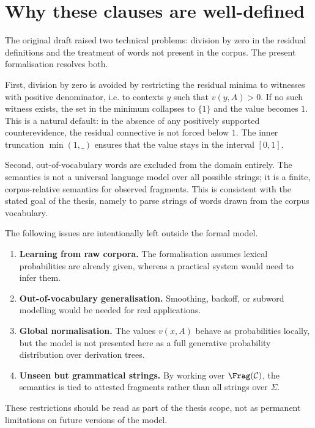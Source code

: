 \section{Why these clauses are well-defined}
The original draft raised two technical problems: division by zero in the residual definitions and
the treatment of words not present in the corpus. The present formalisation resolves both.

First, division by zero is avoided by restricting the residual minima to witnesses with positive
denominator, i.e. to contexts $y$ such that $v(y,A)>0$. If no such witness exists, the set in the
minimum collapses to $\{1\}$ and the value becomes $1$. This is a natural default: in the absence
of any positively supported counterevidence, the residual connective is not forced below $1$.
The inner truncation $\min(1,\_)$ ensures that the value stays in the interval $[0,1]$.

Second, out-of-vocabulary words are excluded from the domain entirely. The semantics is not a
universal language model over all possible strings; it is a finite, corpus-relative semantics for
observed fragments. This is consistent with the stated goal of the thesis, namely to parse strings
of words drawn from the corpus vocabulary.

\begin{remark}
The following issues are intentionally left outside the formal model.
\begin{enumerate}[label=(\alph*)]
    \item \textbf{Learning from raw corpora.} The formalisation assumes lexical probabilities are
    already given, whereas a practical system would need to infer them.
    \item \textbf{Out-of-vocabulary generalisation.} Smoothing, backoff, or subword modelling would be
    needed for real applications.
    \item \textbf{Global normalisation.} The values $v(x,A)$ behave as probabilities locally, but the model is
    not presented here as a full generative probability distribution over derivation trees.
    \item \textbf{Unseen but grammatical strings.} By working over $\Frag(\mathcal C)$, the semantics is tied to
    attested fragments rather than all strings over $\Sigma$.
\end{enumerate}
These restrictions should be read as part of the thesis scope, not as permanent limitations on
future versions of the model.
\end{remark}

